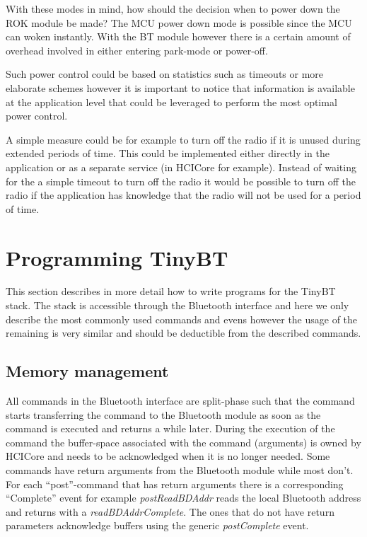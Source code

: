 \documentclass[a4paper,10pt]{article}
\begin{document}
With these modes in mind, how should the decision when to power down
the ROK module be made? The MCU power down mode is possible since the
MCU can woken instantly. With the BT module however there is a certain
amount of overhead involved in either entering park-mode or power-off.

Such power control could be based on statistics such as timeouts or
more elaborate schemes however it is important to notice that
information is available at the application level that could be
leveraged to perform the most optimal power control.

A simple measure could be for example to turn off the radio if it is
unused during extended periods of time. This could be implemented
either directly in the application or as a separate service (in
HCICore for example).  Instead of waiting for the a simple timeout to
turn off the radio it would be possible to turn off the radio if the
application has knowledge that the radio will not be used for a period
of time.

\section{Programming TinyBT}
\label{progtbt}
This section describes in more detail how to write programs for the
TinyBT stack. The stack is accessible through the Bluetooth interface
and here we only describe the most commonly used commands and evens
however the usage of the remaining is very similar and should be
deductible from the described commands.

\subsection{Memory management}
All commands in the Bluetooth interface are split-phase such that the
command starts transferring the command to the Bluetooth module as
soon as the command is executed and returns a while later. During the
execution of the command the buffer-space associated with the command
(arguments) is owned by HCICore and needs to be acknowledged when it
is no longer needed. Some commands have return arguments from the
Bluetooth module while most don't. For each ``post''-command that has
return arguments there is a corresponding ``Complete'' event for
example \emph{postReadBDAddr} reads the local Bluetooth address and
returns with a \emph{readBDAddrComplete}. The ones that do not have
return parameters acknowledge buffers using the generic
\emph{postComplete} event.
\end{document}
